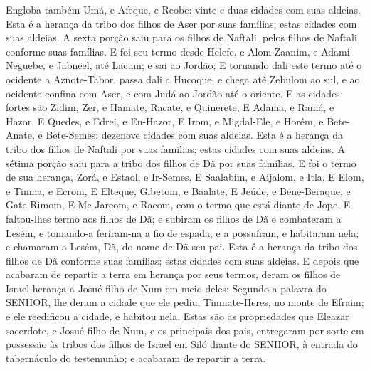 {Engloba também Umá, e Afeque, e Reobe: vinte e duas cidades com suas aldeias.
Esta é a herança da tribo dos filhos de Aser por suas famílias; estas cidades com suas aldeias.
A sexta porção saiu para os filhos de Naftali, pelos filhos de Naftali conforme suas famílias.
E foi seu termo desde Helefe, e Alom-Zaanim, e Adami-Neguebe, e Jabneel, até Lacum; e sai ao Jordão;
E tornando dali este termo até o ocidente a Aznote-Tabor, passa dali a Hucoque, e chega até Zebulom ao sul, e ao ocidente confina com Aser, e com Judá ao Jordão até o oriente.
E as cidades fortes são Zidim, Zer, e Hamate, Racate, e Quinerete,
E Adama, e Ramá, e Hazor,
E Quedes, e Edrei, e En-Hazor,
E Irom, e Migdal-Ele, e Horém, e Bete-Anate, e Bete-Semes: dezenove cidades com suas aldeias.
Esta é a herança da tribo dos filhos de Naftali por suas famílias; estas cidades com suas aldeias.
A sétima porção saiu para a tribo dos filhos de Dã por suas famílias.
E foi o termo de sua herança, Zorá, e Estaol, e Ir-Semes,
E Saalabim, e Aijalom, e Itla,
E Elom, e Timna, e Ecrom,
E Elteque, Gibetom, e Baalate,
E Jeúde, e Bene-Beraque, e Gate-Rimom,
E Me-Jarcom, e Racom, com o termo que está diante de Jope.
E faltou-lhes termo aos filhos de Dã; e subiram os filhos de Dã e combateram a Lesém, e tomando-a feriram-na a fio de espada, e a possuíram, e habitaram nela; e chamaram a Lesém, Dã, do nome de Dã seu pai.
Esta é a herança da tribo dos filhos de Dã conforme suas famílias; estas cidades com suas aldeias.
E depois que acabaram de repartir a terra em herança por seus termos, deram os filhos de Israel herança a Josué filho de Num em meio deles:
Segundo a palavra do SENHOR, lhe deram a cidade que ele pediu, Timnate-Heres, no monte de Efraim; e ele reedificou a cidade, e habitou nela.
Estas são as propriedades que Eleazar sacerdote, e Josué filho de Num, e os principais dos pais, entregaram por sorte em possessão às tribos dos filhos de Israel em Siló diante do SENHOR, à entrada do tabernáculo do testemunho; e acabaram de repartir a terra.

\par }


